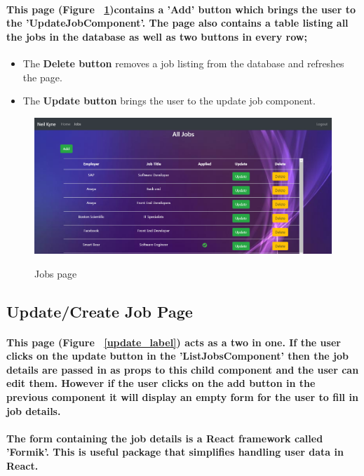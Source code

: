 \paragraph{This page (Figure ~\ref{jobs_label})contains a 'Add' button which brings the user to the 'UpdateJobComponent'. The page also contains a table listing all the jobs in the database as well as two buttons in every row;}
\begin{itemize}
    \item The \textbf{Delete button} removes a job listing from the database and refreshes the page.
    \item The \textbf{Update button} brings the user to the update job component.
\end{itemize}
\begin{figure}[ht]
    \centering
    \includegraphics[scale=0.3]{Images/jobs.png} 
    \label{jobs_label}
    \caption{Jobs page}
\end{figure}
\subsection{Update/Create Job Page}
\paragraph{This page (Figure ~\ref{update_label}) acts as a two in one. If the user clicks on the update button in the 'ListJobsComponent' then the job details are passed in as props to this child component and the user can edit them. However if the user clicks on the add button in the previous component it will display an empty form for the user to fill in job details.}
\paragraph{The form containing the job details is a React framework called 'Formik'. This is useful package that simplifies handling user data in React.}
